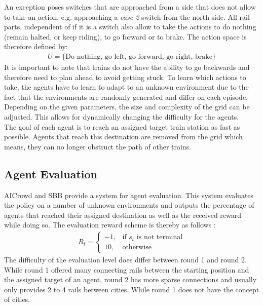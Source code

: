 An exception poses switches that are approached from a side that does not allow to take an action, e.g. approaching a \textit{case 2} switch from the north side.
All rail parts, independent of if it is a switch also allow to take the actions to do nothing (remain halted, or keep riding), to go forward or to brake.
The action space is therefore defined by:
\begin{gather*}
U = \{ \text{Do nothing, go left, go forward, go right, brake} \}
\end{gather*}
It is important to note that trains do not have the ability to go backwards and therefore need to plan ahead to avoid getting stuck. To learn which actions to take, the agents have to learn to adapt to an unknown environment due to the fact that the environments are randomly generated and differ on each episode. Depending on the given parameters, the size and complexity of the grid can be adjusted. This allows for dynamically changing the difficulty for the agents.\\
The goal of each agent is to reach an assigned target train station as fast as possible. Agents that reach this destination are removed from the grid which means, they can no longer obstruct the path of other trains.
\subsection*{Agent Evaluation}\label{rl_agent_eval}
AICrowd and SBB provide a system for agent evaluation. This system evaluates the policy on a number of unknown environments and outputs the percentage of agents that reached their assigned destination as well as the received reward while doing so. The evaluation reward scheme is thereby as follows \cite{flatland_faq}:
\begin{gather*}
R_{t}= 
\begin{cases}
-1,				& \text{if } s_{t} \text{ is not terminal}\\
10,             & \text{otherwise}
\end{cases}
\end{gather*}
The difficulty of the evaluation level does differ between round 1 and round 2. While round 1 offered many connecting rails between the starting position and the assigned target of an agent, round 2 has more sparse connections and usually only provides 2 to 4 rails between cities. While round 1 does not have the concept of cities.

